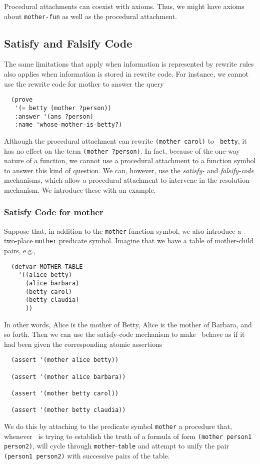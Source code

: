 Procedural attachments can coexist with axioms.  Thus, we might have axioms
about {\tt mother-fun} as well as the procedural attachment.

\subsection{Satisfy and Falsify Code}

The same limitations that apply when information is represented by rewrite
rules also applies when information is stored in rewrite code.  For instance,
we cannot use the rewrite code for mother to answer the query
\begin{verbatim}
  (prove
   '(= betty (mother ?person))
   :answer '(ans ?person)
   :name 'whose-mother-is-betty?)
\end{verbatim}
Although the procedural attachment can rewrite \verb'(mother carol)' to {\tt
betty}, it has no effect on the term \verb'(mother ?person)'.  In fact,
because of the one-way nature of a function, we cannot use a procedural
attachment to a function symbol to answer this kind of question.  We can,
however, use the {\em satisfy-} and {\em falsify-code} mechanisms, which
allow a procedural attachment to intervene in the resolution mechanism.  We
introduce these with an example.

\subsubsection{Satisfy Code for mother}

Suppose that, in addition to the {\tt mother} function symbol, we also
introduce a two-place {\tt mother} predicate symbol.  Imagine that we have a
table of mother-child pairs, e.g.,
\begin{verbatim}
  (defvar MOTHER-TABLE
    '((alice betty)
      (alice barbara)
      (betty carol)
      (betty claudia)
      ))
\end{verbatim}
In other words, Alice is the mother of Betty, Alice is the mother of Barbara,
and so forth.   Then we can use the satisfy-code mechanism to make \snark\
behave as if it had been given the corresponding atomic assertions
\begin{verbatim}
  (assert '(mother alice betty))

  (assert '(mother alice barbara))

  (assert '(mother betty carol))

  (assert '(mother betty claudia))
\end{verbatim}
We do this by attaching to the predicate symbol {\tt mother} a procedure
that, whenever \snark\ is trying to establish the truth of a formula of form
{\tt (mother person1 person2)}, will cycle through
 {\tt mother}-{\tt table} and attempt to unify the pair
\verb'(person1 person2)' with successive pairs of the table.

